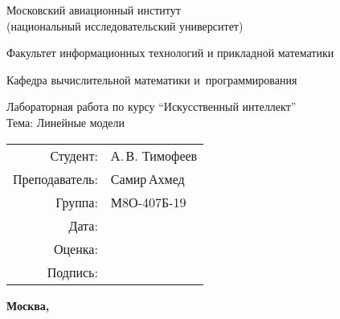 \begin{titlepage}
\begin{center}
\bfseries

{\Large Московский авиационный институт\\ (национальный исследовательский университет)

}

\vspace{48pt}

{\large Факультет информационных технологий и прикладной математики
}

\vspace{36pt}

{\large Кафедра вычислительной математики и~программирования

}


\vspace{48pt}

Лабораторная работа  по курсу \enquote{Искусственный интеллект}\\
Тема: Линейные модели

\end{center}

\vspace{72pt}

\begin{flushright}
\begin{tabular}{rl}
Студент: & А.\,В. Тимофеев \\
Преподаватель: & Самир\,Ахмед \\
Группа: & М8О-407Б-19 \\
Дата: & \\
Оценка: & \\
Подпись: & \\
\end{tabular}
\end{flushright}

\vfill

\begin{center}
\bfseries
Москва, \the\year
\end{center}
\end{titlepage}

\pagebreak